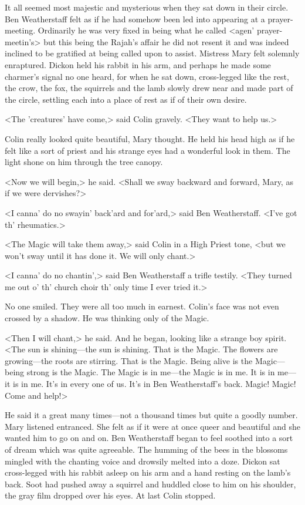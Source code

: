 It all seemed most majestic and mysterious when they sat down in their circle. Ben Weatherstaff felt as if he had somehow been led into appearing at a prayer-meeting. Ordinarily he was very fixed in being what he called <agen' prayer-meetin's> but this being the Rajah's affair he did not resent it and was indeed inclined to be gratified at being called upon to assist. Mistress Mary felt solemnly enraptured. Dickon held his rabbit in his arm, and perhaps he made some charmer's signal no one heard, for when he sat down, cross-legged like the rest, the crow, the fox, the squirrels and the lamb slowly drew near and made part of the circle, settling each into a place of rest as if of their own desire.

<The 'creatures' have come,> said Colin gravely. <They want to help us.>

Colin really looked quite beautiful, Mary thought. He held his head high as if he felt like a sort of priest and his strange eyes had a wonderful look in them. The light shone on him through the tree canopy.

<Now we will begin,> he said. <Shall we sway backward and forward, Mary, as if we were dervishes?>

<I canna' do no swayin' back'ard and for'ard,> said Ben Weatherstaff. <I've got th' rheumatics.>

<The Magic will take them away,> said Colin in a High Priest tone, <but we won't sway until it has done it. We will only chant.>

<I canna' do no chantin',> said Ben Weatherstaff a trifle testily. <They turned me out o' th' church choir th' only time I ever tried it.>

No one smiled. They were all too much in earnest. Colin's face was not even crossed by a shadow. He was thinking only of the Magic.

<Then I will chant,> he said. And he began, looking like a strange boy spirit. <The sun is shining—the sun is shining. That is the Magic. The flowers are growing—the roots are stirring. That is the Magic. Being alive is the Magic—being strong is the Magic. The Magic is in me—the Magic is in me. It is in me—it is in me. It's in every one of us. It's in Ben Weatherstaff's back. Magic! Magic! Come and help!>

He said it a great many times—not a thousand times but quite a goodly number. Mary listened entranced. She felt as if it were at once queer and beautiful and she wanted him to go on and on. Ben Weatherstaff began to feel soothed into a sort of dream which was quite agreeable. The humming of the bees in the blossoms mingled with the chanting voice and drowsily melted into a doze. Dickon sat cross-legged with his rabbit asleep on his arm and a hand resting on the lamb's back. Soot had pushed away a squirrel and huddled close to him on his shoulder, the gray film dropped over his eyes. At last Colin stopped.

